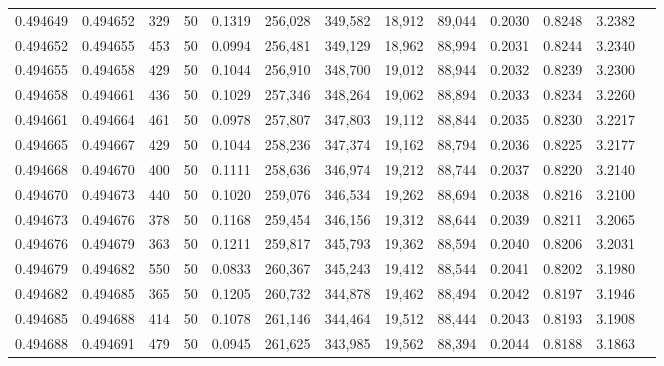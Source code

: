 \begin{tabular}{rrrrrrrrrrrrr}
0.494649 & 0.494652 &   329 &  50 &                                     0.1319 & 256,028 & 349,582 &  18,912 &  89,044 & 0.2030 & 0.8248 & 3.2382 \\
0.494652 & 0.494655 &   453 &  50 &                                     0.0994 & 256,481 & 349,129 &  18,962 &  88,994 & 0.2031 & 0.8244 & 3.2340 \\
0.494655 & 0.494658 &   429 &  50 &                                     0.1044 & 256,910 & 348,700 &  19,012 &  88,944 & 0.2032 & 0.8239 & 3.2300 \\
0.494658 & 0.494661 &   436 &  50 &                                     0.1029 & 257,346 & 348,264 &  19,062 &  88,894 & 0.2033 & 0.8234 & 3.2260 \\
0.494661 & 0.494664 &   461 &  50 &                                     0.0978 & 257,807 & 347,803 &  19,112 &  88,844 & 0.2035 & 0.8230 & 3.2217 \\
0.494665 & 0.494667 &   429 &  50 &                                     0.1044 & 258,236 & 347,374 &  19,162 &  88,794 & 0.2036 & 0.8225 & 3.2177 \\
0.494668 & 0.494670 &   400 &  50 &                                     0.1111 & 258,636 & 346,974 &  19,212 &  88,744 & 0.2037 & 0.8220 & 3.2140 \\
0.494670 & 0.494673 &   440 &  50 &                                     0.1020 & 259,076 & 346,534 &  19,262 &  88,694 & 0.2038 & 0.8216 & 3.2100 \\
0.494673 & 0.494676 &   378 &  50 &                                     0.1168 & 259,454 & 346,156 &  19,312 &  88,644 & 0.2039 & 0.8211 & 3.2065 \\
0.494676 & 0.494679 &   363 &  50 &                                     0.1211 & 259,817 & 345,793 &  19,362 &  88,594 & 0.2040 & 0.8206 & 3.2031 \\
0.494679 & 0.494682 &   550 &  50 &                                     0.0833 & 260,367 & 345,243 &  19,412 &  88,544 & 0.2041 & 0.8202 & 3.1980 \\
0.494682 & 0.494685 &   365 &  50 &                                     0.1205 & 260,732 & 344,878 &  19,462 &  88,494 & 0.2042 & 0.8197 & 3.1946 \\
0.494685 & 0.494688 &   414 &  50 &                                     0.1078 & 261,146 & 344,464 &  19,512 &  88,444 & 0.2043 & 0.8193 & 3.1908 \\
0.494688 & 0.494691 &   479 &  50 &                                     0.0945 & 261,625 & 343,985 &  19,562 &  88,394 & 0.2044 & 0.8188 & 3.1863 \\

\end{tabular}
